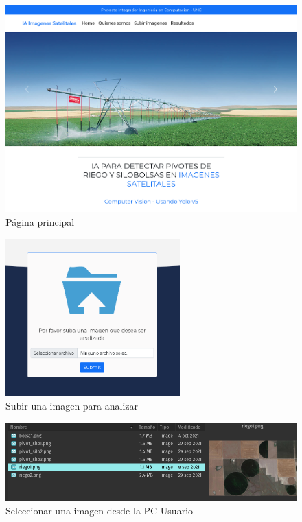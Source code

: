 \begin{figure}[h!]
    \centering
    \includegraphics[width=1\textwidth]{img/FE - main.png}
    \caption{Página principal}
    \label{fig:main}
\end{figure}

\begin{figure}[b!]
    \centering
    \includegraphics[width=0.6\textwidth]{img/FE - upload file.png}
    \caption{Subir una imagen para analizar}
    \label{fig:subir-imagen}
\end{figure}

\begin{figure}[h!]
    \centering
    \includegraphics[width=1\textwidth]{img/FE - select file.png}
    \caption{Seleccionar una imagen desde la PC-Usuario}
    \label{fig:select imagen}
\end{figure}

